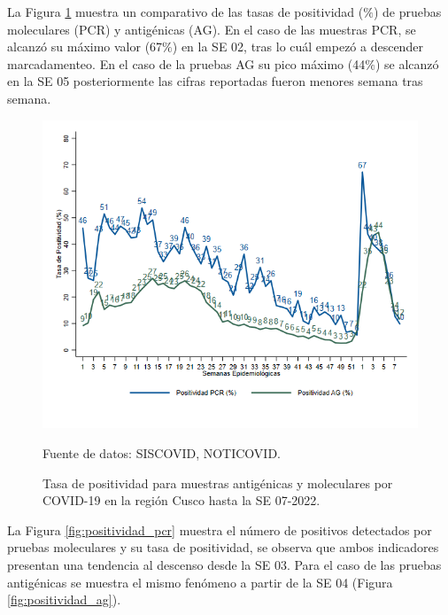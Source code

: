 \documentclass[12pt,a4paper,openany]{book}
\begin{document}
  La Figura \ref{fig:total_muestras_procesada} muestra un comparativo de las tasas de positividad ($\%$) de pruebas moleculares (PCR) y antigénicas (AG). En el caso de las muestras PCR, se alcanzó su máximo valor (67$\%$) en la SE 02, tras lo cuál empezó a descender marcadamenteo. En el caso de la pruebas AG su pico máximo (44$\%$) se alcanzó en la SE 05 posteriormente las cifras reportadas fueron menores semana tras semana.  
  
   \begin{figure}[h]
	\caption{Tasa de positividad para muestras antigénicas y moleculares por COVID-19 en la región Cusco hasta la SE 07-2022. }\label{fig:total_muestras_procesada}
	\begin{center}
		\includegraphics[width=0.75\linewidth]{../figuras/positividad_diaria_2021_2022.png}
	\end{center}
	{\footnotesize {Fuente de datos: SISCOVID, NOTICOVID.}}
\end{figure}


La Figura \ref{fig:positividad_pcr} muestra el número de positivos detectados por pruebas moleculares y su tasa de positividad, se observa que ambos indicadores presentan una tendencia al descenso desde la SE 03. Para el caso de las pruebas antigénicas se muestra el mismo fenómeno a partir de la SE 04 (Figura \ref{fig:positividad_ag}). 
\end{document}

